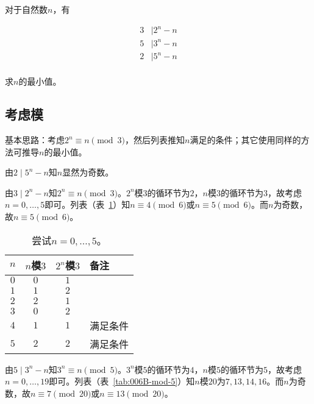 

对于自然数$n$，有

\begin{align*}
  3 &\mid 2^n - n \\
  5 &\mid 3^n - n \\
  2 &\mid 5^n - n \\
\end{align*}

求$n$的最小值。


\subsection{考虑模}

基本思路：考虑$2^n \equiv n \pmod 3$，然后列表推知$n$满足的条件；其它使用同样的方法可推导$n$的最小值。

由$2 \mid 5^n - n$知$n$显然为奇数。

由$3 \mid 2^n - n$知$2^n \equiv n \pmod 3$。$2^n$模$3$的循环节为$2$，$n$模$3$的循环节为$3$，故考虑$n = 0, \dots, 5$即可。列表（表~\ref{tab:006B-mod-3}）知$n \equiv 4 \pmod 6$或$n \equiv 5 \pmod 6$。而$n$为奇数，故$n \equiv 5 \pmod 6$。

\begin{table}[hbp]
  \centering
  \begin{tabular}{cccl}
    \toprule
    $n$ & $n$模$3$ & $2^n$模$3$ & 备注 \\
    \midrule
    $0$ & $0$ & $1$ & \\
    $1$ & $1$ & $2$ & \\
    $2$ & $2$ & $1$ & \\
    $3$ & $0$ & $2$ & \\
    $4$ & $1$ & $1$ & 满足条件 \\
    $5$ & $2$ & $2$ & 满足条件 \\
    \bottomrule
  \end{tabular}
  \caption{尝试$n = 0, \dots, 5$。} \label{tab:006B-mod-3}
\end{table}

由$5 \mid 3^n - n$知$3^n \equiv n \pmod 5$。$3^n$模$5$的循环节为$4$，$n$模$5$的循环节为$5$，故考虑$n = 0, \dots, 19$即可。列表（表~\ref{tab:006B-mod-5}）知$n$模$20$为$7, 13, 14, 16$。而$n$为奇数，故$n \equiv 7 \pmod 20$或$n \equiv 13 \pmod 20$。

